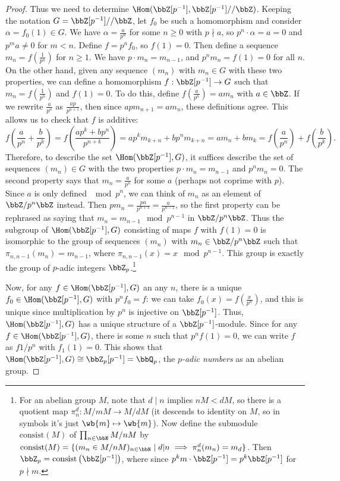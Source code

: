 \begin{proof}
    Thus we need to determine $\Hom(\bbZ[p^{-1}],\bbZ[p^{-1}]/\slash \bbZ)$. Keeping the notation $G=\bbZ[p^{-1}]/\slash \bbZ$, let $f_0$ be such a homomorphism and consider $\alpha=f_0(1)\in G$. We have $\alpha=\frac{a}{p^n}$ for some $n\geq 0$ with $p\nmid a$, so $p^n\cdot \alpha=a=0$ and $p^ma\neq 0$ for $m<n$. Define $f=p^nf_0$, so $f(1)=0$. Then define a sequence $m_n=f\left(\frac{1}{p^n}\right)$ for $n\geq 1$. We have $p\cdot m_n=m_{n-1}$, and $p^n m_n=f(1)=0$ for all $n$. On the other hand, given any sequence $(m_n)$ with $m_n\in G$ with these two properties, we can define a homomorphism $f:\bbZ[p^{-1}]\to G$ such that $m_n=f\left(\frac{1}{p^n}\right)$  and $f(1)=0$. To do this, define $f\left(\frac{a}{p^n}\right)=am_n$ with $a\in\bbZ$. If we rewrite $\frac{a}{p^n}$ as $\frac{ap}{p^{n+1}}$, then since $apm_{n+1}=am_n$, these definitions agree. This allows us to check that $f$ is additive:
    \[f\left(\frac{a}{p^n}+\frac{b}{p^k}\right)=f\left(\frac{ap^k+bp^n}{p^{n+k}}\right)=ap^km_{k+n}+bp^nm_{k+n}=am_n+bm_k=f\left(\frac{a}{p^n}\right)+f\left(\frac{b}{p^k}\right).\]
    Therefore, to describe the set $\Hom(\bbZ[p^{-1}],G)$, it suffices describe the set of sequences $(m_n)\in G$ with the two properties $p\cdot m_n=m_{n-1}$ and $p^nm_n=0$. The second property says that $m_n=\frac{a}{p^n}$ for some $a$ (perhaps not coprime with $p$). Since $a$ is only defined $\mod p^n$, we can think of $m_n$ as an element of $\bbZ\slash p^n\bbZ$ instead. Then $pm_n=\frac{pa}{p^{n+1}}=\frac{a}{p^{n-1}}$, so the first property can be rephrased as saying that $m_n=m_{n-1}\mod p^{n-1}$ in $\bbZ\slash p^n\bbZ$. Thus the subgroup of $\Hom(\bbZ[p^{-1}],G)$ consisting of maps $f$ with $f(1)=0$ is isomorphic to the group of sequences $(m_n)$ with $m_n\in\bbZ\slash p^n\bbZ$ such that $\pi_{n,n-1}(m_n)=m_{n-1}$, where $\pi_{n,n-1}(x)=x\mod p^{n-1}$. This group is exactly the group of $p$-adic integers $\bbZ_p$.\footnote{For an abelian group $M$, note that $d\mid n$ implies $nM<dM$, so there is a quotient map $\pi_n^d:M\slash mM\to M\slash dM$ (it descends to identity on $M$, so in symbols it's just $\wb{m}\mapsto \wb{m}$). Now define the submodule $\mathrm{consist}(M)$ of $\prod_{n\in\bbN}M\slash nM$ by $\mathrm{consist}(M)=\{(m_n\in M\slash nM)_{n\in\bbN}\mid d|n\implies \pi_n^d(m_n)=m_d\}$. Then $\bbZ_p=\mathrm{consist}\left(\bbZ[p^{-1}]\right)$, where  since $p^km\cdot\bbZ[p^{-1}]=p^k\bbZ[p^{-1}]$ for $p\nmid m$.}

    Now, for any $f\in\Hom(\bbZ[p^{-1}],G)$ an any $n$, there is a unique $f_0\in\Hom(\bbZ[p^{-1}],G)$ with $p^nf_0=f$: we can take $f_0(x)=f\left(\frac{x}{p^n}\right)$, and this is unique since multiplication by $p^n$ is injective on $\bbZ[p^{-1}]$. Thus, $\Hom(\bbZ[p^{-1}],G)$ has a unique structure of a $\bbZ[p^{-1}]$-module. Since for any $f\in \Hom(\bbZ[p^{-1}],G)$, there is some $n$ such that $p^nf(1)=0$, we can write $f$ as $f1/p^n$  with $f_1(1)=0$. This shows that $\Hom(\bbZ[p^{-1}],G)\cong \bbZ_p[p^{-1}]=\bbQ_p$, the \emph{$p$-adic numbers} as an abelian group.
    

\end{proof}
